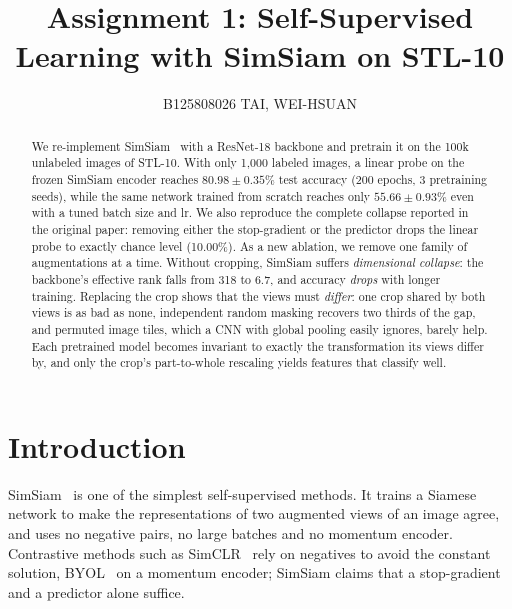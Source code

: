 \documentclass[10pt,twocolumn,letterpaper]{article}
\title{Assignment 1: Self-Supervised Learning with SimSiam on STL-10}
\author{B125808026 TAI, WEI-HSUAN}
\begin{document}
\maketitle

\begin{abstract}
We re-implement SimSiam~\cite{chen2021simsiam} with a ResNet-18 backbone and pretrain it on the 100k unlabeled images of STL-10.
With only 1,000 labeled images, a linear probe on the frozen SimSiam encoder reaches $80.98\pm0.35\%$ test accuracy (200 epochs, 3 pretraining seeds), while the same network trained from scratch reaches only $55.66\pm0.93\%$ even with a tuned batch size and lr.
We also reproduce the complete collapse reported in the original paper: removing either the stop-gradient or the predictor drops the linear probe to exactly chance level (10.00\%).
As a new ablation, we remove one family of augmentations at a time. Without cropping, SimSiam suffers \emph{dimensional collapse}: the backbone's effective rank falls from 318 to 6.7, and accuracy \emph{drops} with longer training.
Replacing the crop shows that the views must \emph{differ}: one crop shared by both views is as bad as none, independent random masking recovers two thirds of the gap, and permuted image tiles, which a CNN with global pooling easily ignores, barely help. Each pretrained model becomes invariant to exactly the transformation its views differ by, and only the crop's part-to-whole rescaling yields features that classify well.
\end{abstract}

\section{Introduction}
\label{sec:intro}

SimSiam~\cite{chen2021simsiam} is one of the simplest self-supervised methods. It trains a Siamese network to make the representations of two augmented views of an image agree, and uses no negative pairs, no large batches and no momentum encoder.
Contrastive methods such as SimCLR~\cite{chen2020simclr} rely on negatives to avoid the constant solution, BYOL~\cite{grill2020byol} on a momentum encoder; SimSiam claims that a stop-gradient and a predictor alone suffice.
\end{document}
